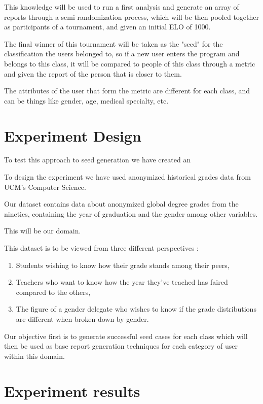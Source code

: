 This knowledge will be used to run a first analysis and generate an array of reports through a semi randomization process, 
which will be then pooled together as participants of a tournament, and given an initial ELO of 1000.

The final winner of this tournament will be taken as the "seed" for the classification the users belonged to, 
so if a new user enters the program and belongs to this class, it will be compared to people of this class through a metric and given the report of the person that is closer to them.

The attributes of the user that form the metric are different for each class, and can be things like gender, age, medical specialty, etc.
\section{Experiment Design}
\label{cap1:sec:experimentdesign}
To test this approach to seed generation we have created an

To design the experiment we have used anonymized historical grades data from UCM's Computer Science.

Our dataset contains data about anonymized global degree grades from the nineties, containing the year of graduation and the gender among other variables.

This will be our domain.

This dataset is to be viewed from three different perspectives : 
\begin{enumerate}
\item Students wishing to know how their grade stands among their peers, 
\item Teachers who want to know how the year they've teached has faired compared to the others, 
\item The figure of a gender delegate who wishes to know if the grade distributions are different when broken down by gender.
\end{enumerate}

Our objective first is to generate successful seed cases for each class which will then be used as base report generation techniques for each category of user within this domain. 
\section{Experiment results}
\label{cap1:sec:experimentresults}

